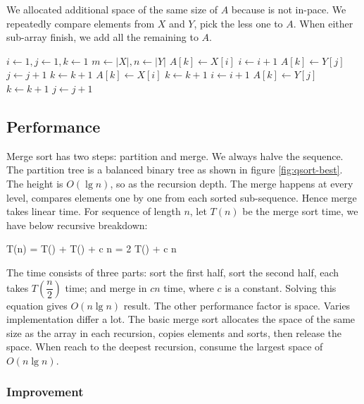 \documentclass[b5paper]{article}
\begin{document}
We allocated additional space of the same size of $A$ because  is not in-pace. We repeatedly compare elements from $X$ and $Y$, pick the less one to $A$. When either sub-array finish, we add all the remaining to $A$.

\begin{algorithmic}[1]
  \State $i \gets 1, j\gets 1, k\gets 1$
  \State $m \gets |X|, n \gets |Y|$
      \State $A[k] \gets X[i]$
      \State $i \gets i + 1$
    \Else
      \State $A[k] \gets Y[j]$
      \State $j \gets j + 1$
    \EndIf
    \State $k \gets k + 1$
  \EndWhile
    \State $A[k] \gets X[i]$
    \State $k \gets k + 1$
    \State $i \gets i + 1$
  \EndWhile
    \State $A[k] \gets Y[j]$
    \State $k \gets k + 1$
    \State $j \gets j + 1$
  \EndWhile
\EndProcedure
\end{algorithmic}

\subsection{Performance}

Merge sort has two steps: partition and merge. We always halve the sequence. The partition tree is a balanced binary tree as shown in figure \cref{fig:qsort-best}. The height is $O(\lg n)$, so as the recursion depth. The merge happens at every level, compares elements one by one from each sorted sub-sequence. Hence merge takes linear time. For sequence of length $n$, let $T(n)$ be the merge sort time, we have below recursive breakdown:

\be
T(n) = T() + T() + c n = 2 T() + c n
\ee

The time consists of three parts: sort the first half, sort the second half, each takes $T(\dfrac{n}{2})$ time; and merge in $c n$ time, where $c$ is a constant. Solving this equation gives $O(n \lg n)$ result. The other performance factor is space. Varies implementation differ a lot. The basic merge sort allocates the space of the same size as the array in each recursion, copies elements and sorts, then release the space. When reach to the deepest recursion, consume the largest space of $O(n \lg n)$.

\subsubsection{Improvement}
\end{document}
